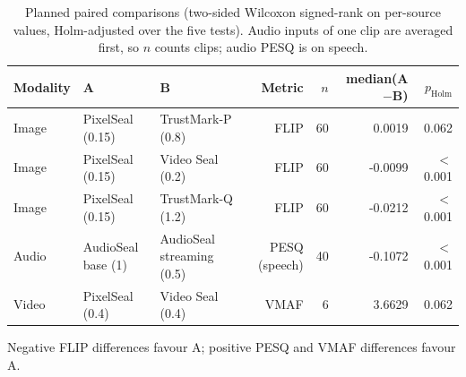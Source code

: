 \begin{table}[!t]
\centering
\footnotesize
\caption{Planned paired comparisons (two-sided Wilcoxon signed-rank on per-source values, Holm-adjusted over the five tests). Audio inputs of one clip are averaged first, so $n$ counts clips; audio PESQ is on speech.}
\label{tab:wm-tests}
\setlength{\tabcolsep}{3.4pt}
\begin{tabular}{lllrrrr}
\toprule
Modality & A & B & Metric & $n$ & median(A$-$B) & $p_{\mathrm{Holm}}$ \\
\midrule
Image & PixelSeal (0.15) & TrustMark-P (0.8) & FLIP & 60 & 0.0019 & 0.062 \\
Image & PixelSeal (0.15) & Video Seal (0.2) & FLIP & 60 & -0.0099 & $<$0.001 \\
Image & PixelSeal (0.15) & TrustMark-Q (1.2) & FLIP & 60 & -0.0212 & $<$0.001 \\
Audio & AudioSeal base (1) & AudioSeal streaming (0.5) & PESQ (speech) & 40 & -0.1072 & $<$0.001 \\
Video & PixelSeal (0.4) & Video Seal (0.4) & VMAF & 6 & 3.6629 & 0.062 \\
\bottomrule
\end{tabular}
\par\vspace{2pt}\parbox{\linewidth}{\raggedright\scriptsize Negative FLIP differences favour A; positive PESQ and VMAF differences favour A.}
\end{table}
